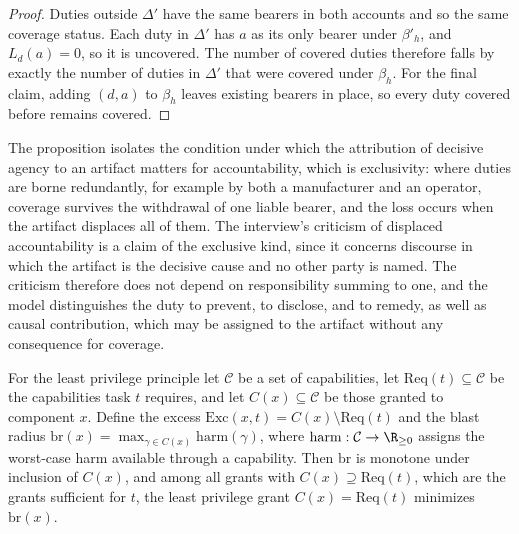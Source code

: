 \begin{proof}
Duties outside $\Delta'$ have the same bearers in both accounts and so the same coverage status. Each duty in $\Delta'$ has $a$ as its only bearer under $\beta'_h$, and $L_d(a)=0$, so it is uncovered. The number of covered duties therefore falls by exactly the number of duties in $\Delta'$ that were covered under $\beta_h$. For the final claim, adding $(d,a)$ to $\beta_h$ leaves existing bearers in place, so every duty covered before remains covered.
\end{proof}

The proposition isolates the condition under which the attribution of decisive agency to an artifact matters for accountability, which is exclusivity: where duties are borne redundantly, for example by both a manufacturer and an operator, coverage survives the withdrawal of one liable bearer, and the loss occurs when the artifact displaces all of them. The interview's criticism of displaced accountability is a claim of the exclusive kind, since it concerns discourse in which the artifact is the decisive cause and no other party is named. The criticism therefore does not depend on responsibility summing to one, and the model distinguishes the duty to prevent, to disclose, and to remedy, as well as causal contribution, which may be assigned to the artifact without any consequence for coverage.

For the least privilege principle let $\mathcal{C}$ be a set of capabilities, let $\mathrm{Req}(t)\subseteq\mathcal{C}$ be the capabilities task $t$ requires, and let $C(x)\subseteq\mathcal{C}$ be those granted to component $x$. Define the excess $\mathrm{Exc}(x,t)=C(x)\setminus\mathrm{Req}(t)$ and the blast radius $\mathrm{br}(x)=\max_{\gamma\in C(x)}\mathrm{harm}(\gamma)$, where $\mathrm{harm}:\mathcal{C}\to\R_{\ge0}$ assigns the worst-case harm available through a capability. Then $\mathrm{br}$ is monotone under inclusion of $C(x)$, and among all grants with $C(x)\supseteq\mathrm{Req}(t)$, which are the grants sufficient for $t$, the least privilege grant $C(x)=\mathrm{Req}(t)$ minimizes $\mathrm{br}(x)$.
